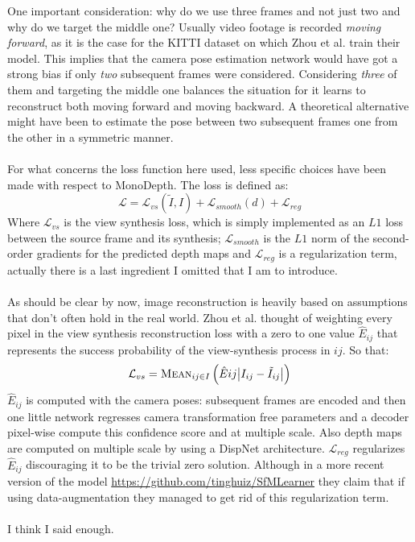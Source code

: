 One important consideration: why do we use three frames and not just two and why do we target the middle one? Usually video footage is recorded \textit{moving forward}, as it is the case for the KITTI dataset on which Zhou et al. train their model. This implies that the camera pose estimation network would have got a strong bias if only \textit{two} subsequent frames were considered. Considering \textit{three} of them and targeting the middle one balances the situation for it learns to reconstruct both moving forward and moving backward. A theoretical alternative might have been to estimate the pose between two subsequent frames one from the other in a symmetric manner.\\
\\
For what concerns the loss function here used, less specific choices have been made with respect to MonoDepth. The loss is defined as:\\
\[
	\mathcal{L} = \mathcal{L}_{vs}(\tilde{I}, I) + \mathcal{L}_{smooth}(d) + \mathcal{L}_{reg}
\]
Where $\mathcal{L}_{vs}$ is the view synthesis loss, which is simply implemented as an $L1$ loss between the source frame and its synthesis; $\mathcal{L}_{smooth}$ is the $L1$ norm of the second-order gradients for the predicted depth maps and $\mathcal{L}_{reg}$ is a regularization term, actually there is a last ingredient I omitted that I am to introduce.\\
\\
As should be clear by now, image reconstruction is heavily based on assumptions that don't often hold in the real world. Zhou et al. thought of weighting every pixel in the view synthesis reconstruction loss with a zero to one value $\hat{E}_{ij}$ that represents the success probability of the view-synthesis process in $ij$. So that:\\
\[
	\mathcal{L}_{vs} = \textsc{Mean}_{ij \in I}
		\left(
			\hat{E}{ij} \big| I_{ij} - \tilde{I}_{ij} \big|
		\right)
\]
$\hat{E}_{ij}$ is computed with the camera poses: subsequent frames are encoded and then one little network regresses camera transformation free parameters and a decoder pixel-wise compute this confidence score and at multiple scale. Also depth maps are computed on multiple scale by using a DispNet architecture.  $\mathcal{L}_{reg}$ regularizes $\hat{E}_{ij}$ discouraging it to be the trivial zero solution. Although in a more recent version of the model \url{https://github.com/tinghuiz/SfMLearner} they claim that if using data-augmentation they managed to get rid of this regularization term.\\
\\
I think I said enough.

